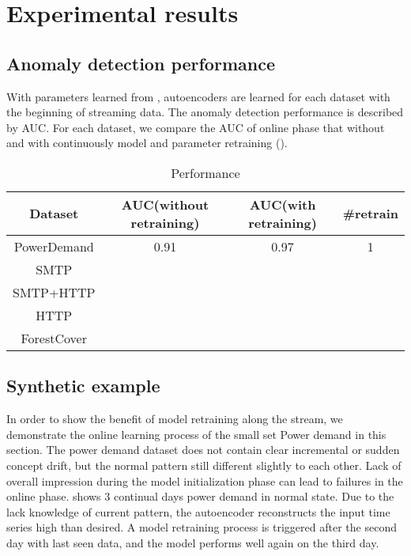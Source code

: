 \chapter{Experimental results}
\label{chap:results}


\section{Anomaly detection performance}
\label{sec:performance}

With parameters learned from , autoencoders are learned for each dataset with the beginning of streaming data. The anomaly detection performance is described by AUC. For each dataset, we compare the AUC of online phase that without and with continuously model and parameter retraining (). 

\begin{table}[h] 
\caption{Performance} 
\centering      
\begin{tabular}{c | c | c | c}  
\hline  
Dataset & AUC(without retraining) & AUC(with retraining) & \#retrain \\ 
\hline 
PowerDemand & 0.91 & 0.97 & 1  \\  
\hline 
SMTP &  &  &  \\ 
\hline 
SMTP+HTTP &  &  & \\ 
\hline 
HTTP &  &   &   \\ 
\hline 
ForestCover & &  & \\   
\hline    
\end{tabular}
\label{tab:performance}  
\end{table} 

\section{Synthetic example}
\label{sec:synthetic}

In order to show the benefit of model retraining along the stream, we demonstrate the online learning process of the small set Power demand in this section. The power demand dataset does not contain clear incremental or sudden concept drift, but the normal pattern still different slightly to each other. Lack of overall impression during the model initialization phase can lead to failures in the online phase.  shows 3 continual days power demand in normal state. Due to the lack knowledge of current pattern, the autoencoder reconstructs the input time series high than desired. A model retraining process is triggered after the second day with last seen data, and the model performs well again on the third day.

